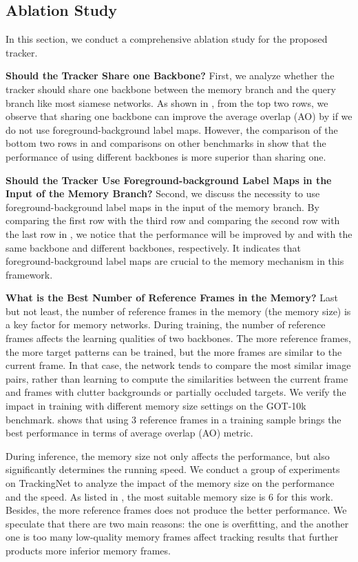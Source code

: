 \documentclass[final]{cvpr}
\begin{document}
\subsection{Ablation Study}\label{subsec:ablation-study}
In this section, we conduct a comprehensive ablation study for the proposed tracker.
\par
\textbf{Should the Tracker Share one Backbone?}
First, we analyze whether the tracker should share one backbone between the memory branch and the query branch like most siamese networks. As shown in , from the top two rows, we observe that sharing one backbone can improve the average overlap (AO) by  if we do not use foreground-background label maps.
However, the comparison of the bottom two rows in  and comparisons on other benchmarks in  show that the performance of using different backbones is more superior than sharing one.

\textbf{Should the Tracker Use Foreground-background Label Maps in the Input of the Memory Branch?}
Second, we discuss the necessity to use foreground-background label maps in the input of the memory branch.
By comparing the first row with the third row and comparing the second row with the last row in , we notice that the performance will be improved by  and  with the same backbone and different backbones, respectively.
It indicates that foreground-background label maps are crucial to the memory mechanism in this framework.

\textbf{What is the Best Number of Reference Frames in the Memory?}
Last but not least, the number of reference frames in the memory (\ie the memory size) is a key factor for memory networks.
During training, the number of reference frames affects the learning qualities of two backbones.
The more reference frames, the more target patterns can be trained, but the more frames are similar to the current frame.
In that case, the network tends to compare the most similar image pairs, rather than learning to compute the similarities between the current frame and frames with clutter backgrounds or partially occluded targets.
We verify the impact in training with different memory size settings on the GOT-10k benchmark.
 shows that using 3 reference frames in a training sample brings the best performance in terms of average overlap (AO) metric.
\par
During inference, the memory size not only affects the performance, but also significantly determines the running speed.
We conduct a group of experiments on TrackingNet to analyze the impact of the memory size on the performance and the speed.
As listed in , the most suitable memory size is 6 for this work.
Besides, the more reference frames does not produce the better performance.
We speculate that there are two main reasons: the one is overfitting, and the another one is too many low-quality memory frames affect tracking results that further products more inferior memory frames.
\end{document}
